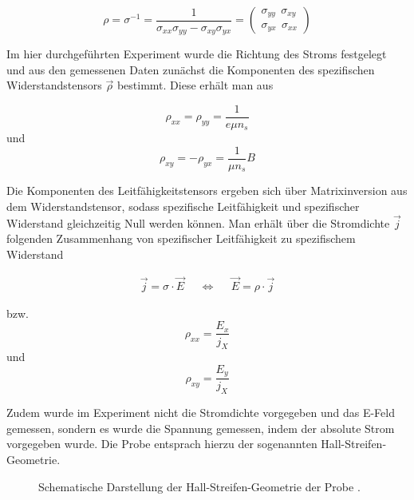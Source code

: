 \begin{equation}
\rho=\sigma^{-1}=\frac{1}{\sigma_{xx}\sigma_{yy} - \sigma_{xy}\sigma_{yx}}=\begin{pmatrix}
\sigma_{yy} ~~ \sigma_{xy} \\ \sigma_{yx} ~~ \sigma_{xx}
\end{pmatrix}
\label{eq:widerstandstensor_matrixinversion}
\end{equation}

Im hier durchgeführten Experiment wurde die Richtung des Stroms festgelegt und aus den gemessenen Daten zunächst die Komponenten des spezifischen Widerstandstensors $\vec{\rho}$ bestimmt. 
Diese erhält man aus

\begin{equation}
\rho_{xx}=\rho_{yy}=\frac{1}{e\mu n_s}
\label{eq:widerst_tensor_xx_yy}
\end{equation}
und
\begin{equation}
\rho_{xy}=-\rho_{yx}=\frac{1}{\mu n_s}B
\label{eq:widerst_tensor_xy_yx}
\end{equation}

Die Komponenten des Leitfähigkeitstensors ergeben sich über Matrixinversion aus dem Widerstandstensor, sodass spezifische Leitfähigkeit und spezifischer Widerstand gleichzeitig Null werden können. Man erhält über die Stromdichte $\vec{j}$ folgenden Zusammenhang von spezifischer Leitfähigkeit zu spezifischem Widerstand

\begin{align}
	\vec{j} = \sigma \cdot \vec{E} & & \Leftrightarrow & & \vec{E} = \rho \cdot \vec{j}
	\label{eq:e2rho}
\end{align}

bzw. 
\begin{equation}
\rho_{xx}=\frac{E_x}{j_X}
\label{eq:rho_xx_def}
\end{equation}
und 
\begin{equation}
\rho_{xy}=\frac{E_y}{j_X}
\label{eq:rho_xy_def}
\end{equation}

Zudem wurde im Experiment nicht die Stromdichte vorgegeben und das E-Feld gemessen, sondern es wurde die Spannung gemessen, indem der absolute Strom vorgegeben wurde. Die Probe entsprach hierzu der sogenannten Hall-Streifen-Geometrie. 

\begin{figure}
\centering
{}
\caption[Hallstreifengeometrie]{Schematische Darstellung der Hall-Streifen-Geometrie der Probe \cite{anleitung}.}
\label{fig:Hallstreifen_Geometrie_Anleitungsheft}
\end{figure}


